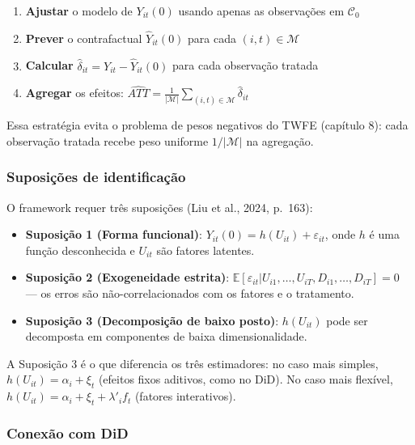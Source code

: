 \documentclass[
]{article}
\providecommand{\tightlist}{%
  \setlength{\itemsep}{0pt}\setlength{\parskip}{0pt}}
\begin{document}
\begin{enumerate}
\def\labelenumi{\arabic{enumi}.}
\tightlist
\item
  \textbf{Ajustar} o modelo de \(Y_{it}(0)\) usando apenas as observações em \(\mathcal{C}_0\)
\item
  \textbf{Prever} o contrafactual \(\hat{Y}_{it}(0)\) para cada \((i,t) \in \mathcal{M}\)
\item
  \textbf{Calcular} \(\hat{\delta}_{it} = Y_{it} - \hat{Y}_{it}(0)\) para cada observação tratada
\item
  \textbf{Agregar} os efeitos: \(\widehat{ATT} = \frac{1}{|\mathcal{M}|} \sum_{(i,t) \in \mathcal{M}} \hat{\delta}_{it}\)
\end{enumerate}

Essa estratégia evita o problema de pesos negativos do TWFE (capítulo 8): cada observação tratada recebe peso uniforme \(1/|\mathcal{M}|\) na agregação.

\subsubsection{Suposições de identificação}\label{suposiuxe7uxf5es-de-identificauxe7uxe3o-1}

O framework requer três suposições (Liu et al., 2024, p.~163):

\begin{itemize}
\tightlist
\item
  \textbf{Suposição 1 (Forma funcional)}: \(Y_{it}(0) = h(U_{it}) + \varepsilon_{it}\), onde \(h\) é uma função desconhecida e \(U_{it}\) são fatores latentes.
\item
  \textbf{Suposição 2 (Exogeneidade estrita)}: \(\mathbb{E}[\varepsilon_{it} | U_{i1}, \ldots, U_{iT}, D_{i1}, \ldots, D_{iT}] = 0\) --- os erros são não-correlacionados com os fatores e o tratamento.
\item
  \textbf{Suposição 3 (Decomposição de baixo posto)}: \(h(U_{it})\) pode ser decomposta em componentes de baixa dimensionalidade.
\end{itemize}

A Suposição 3 é o que diferencia os três estimadores: no caso mais simples, \(h(U_{it}) = \alpha_i + \xi_t\) (efeitos fixos aditivos, como no DiD). No caso mais flexível, \(h(U_{it}) = \alpha_i + \xi_t + \lambda'_i f_t\) (fatores interativos).

\subsubsection{Conexão com DiD}\label{conexuxe3o-com-did}
\end{document}
